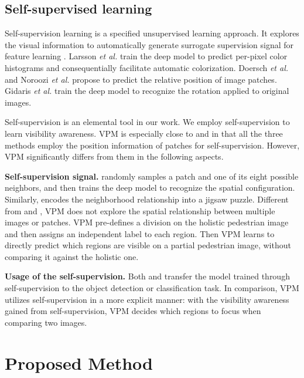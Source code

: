 \documentclass[10pt,twocolumn,letterpaper]{article}
\begin{document}
\subsection {Self-supervised learning}
Self-supervision learning is a specified unsupervised learning approach. It explores the visual information to automatically generate surrogate supervision signal for feature learning \cite{Noroozi2016Self, DBLP:conf/iccv/0004HG17,Larsson2016Color, Doersch2015Self, DBLP:conf/icml/LeRMDCCDN12}. Larsson \emph {et al.} \cite{Larsson2016Color} train the deep model to predict per-pixel color histograms and consequentially facilitate automatic colorization. Doersch \emph{et al.} \cite{Doersch2015Self} and Noroozi \emph{et al.} \cite{Noroozi2016Self} propose to predict the relative position of image patches. Gidaris \emph{et al.} train the deep model to recognize the rotation applied to original images. 

Self-supervision is an elemental tool in our work. We employ self-supervision to learn visibility awareness. VPM is especially close to \cite{Doersch2015Self} and \cite{Noroozi2016Self} in that all the three methods employ the position information of patches for self-supervision. However, VPM significantly differs from them in the following aspects.



\textbf{Self-supervision signal.} \cite{Doersch2015Self} randomly samples a patch and one of its eight possible neighbors, and then trains the deep model to recognize the spatial configuration. Similarly, \cite{Noroozi2016Self} encodes the neighborhood relationship into a jigsaw puzzle. Different from \cite{Doersch2015Self} and \cite{Noroozi2016Self}, VPM does not explore the spatial relationship between multiple images or patches. 
VPM pre-defines a division on the holistic pedestrian image and then assigns an independent label to each region. Then VPM learns to directly predict which regions are visible on a partial pedestrian image, without comparing it against the holistic one. 

\textbf{Usage of the self-supervision.} Both \cite{Doersch2015Self} and \cite{Noroozi2016Self} transfer the model trained through self-supervision to the object detection or classification task. In comparison, VPM utilizes self-supervision in a more explicit manner: with the visibility awareness gained from self-supervision, VPM decides which regions to focus when comparing two images. 



\section {Proposed Method}
\end{document}
